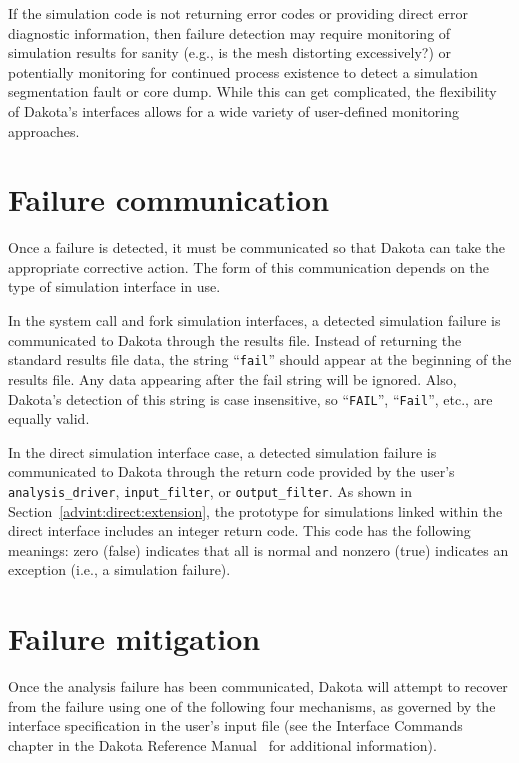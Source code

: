If the simulation code is not returning error codes or providing
direct error diagnostic information, then failure detection may
require monitoring of simulation results for sanity (e.g., is the mesh
distorting excessively?) or potentially monitoring for continued
process existence to detect a simulation segmentation fault or core
dump. While this can get complicated, the flexibility of Dakota's
interfaces allows for a wide variety of user-defined monitoring
approaches.

\section{Failure communication}\label{failure:communication}

Once a failure is detected, it must be communicated so that Dakota can
take the appropriate corrective action. The form of this communication
depends on the type of simulation interface in use.

In the system call and fork simulation interfaces, a detected
simulation failure is communicated to Dakota through the results file.
Instead of returning the standard results file data, the string
``\texttt{fail}'' should appear at the beginning of the results file.
Any data appearing after the fail string will be ignored. Also,
Dakota's detection of this string is case insensitive, so
``\texttt{FAIL}'', ``\texttt{Fail}'', etc., are equally valid.

In the direct simulation interface case, a detected simulation
failure is communicated to Dakota through the return code provided by
the user's \texttt{analysis\_driver},
\texttt{input\_filter}, or \texttt{output\_filter}. As shown in
Section~\ref{advint:direct:extension}, the prototype for simulations
linked within the direct interface includes an integer return code.
This code has the following meanings: zero (false) indicates that all
is normal and nonzero (true) indicates an exception (i.e., a
simulation failure).

\section{Failure mitigation}\label{failure:mitigation}

Once the analysis failure has been communicated, Dakota will attempt
to recover from the failure using one of the following four
mechanisms, as governed by the interface specification in the user's
input file (see the Interface Commands chapter in the Dakota Reference
Manual~\cite{RefMan} for additional information).

